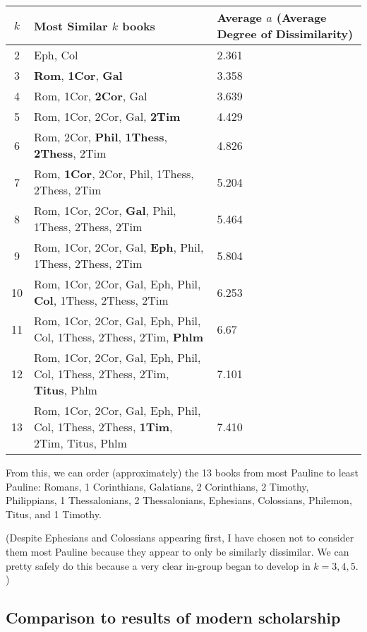 \documentclass[12pt,letterpaper]{article}
\begin{document}
\begin{center}
\begin{tabular}{|c|p{10cm}|p{5cm}|}
\hline
$k$ & Most Similar $k$ books & Average $a$ (Average Degree of Dissimilarity) \\\hline \hline
2 & Eph, Col & 2.361 \\ \hline
3 & \textbf{Rom},\textbf{ 1Cor}, \textbf{Gal} & 3.358 \\ \hline
4 & Rom, 1Cor, \textbf{2Cor}, Gal & 3.639 \\ \hline
5 & Rom, 1Cor, 2Cor, Gal, \textbf{2Tim} & 4.429 \\ \hline
6 & Rom, 2Cor, \textbf{Phil}, \textbf{1Thess}, \textbf{2Thess}, 2Tim & 4.826 \\ \hline
7 & Rom, \textbf{1Cor}, 2Cor, Phil, 1Thess, 2Thess, 2Tim & 5.204 \\ \hline
8 & Rom, 1Cor, 2Cor, \textbf{Gal}, Phil, 1Thess, 2Thess, 2Tim & 5.464 \\ \hline
9 & Rom, 1Cor, 2Cor, Gal, \textbf{Eph}, Phil, 1Thess, 2Thess, 2Tim & 5.804 \\ \hline
10 & Rom, 1Cor, 2Cor, Gal, Eph, Phil, \textbf{Col}, 1Thess, 2Thess, 2Tim & 6.253 \\ \hline
11 & Rom, 1Cor, 2Cor, Gal, Eph, Phil, Col, 1Thess, 2Thess, 2Tim, \textbf{Phlm} & 6.67 \\ \hline
12 & Rom, 1Cor, 2Cor, Gal, Eph, Phil, Col, 1Thess, 2Thess, 2Tim, \textbf{Titus}, Phlm & 7.101 \\ \hline
13 & Rom, 1Cor, 2Cor, Gal, Eph, Phil, Col, 1Thess, 2Thess, \textbf{1Tim}, 2Tim, Titus, Phlm & 7.410 \\ \hline
\end{tabular}
\end{center}

From this, we can order (approximately) the 13 books from most Pauline to least Pauline: Romans, 1 Corinthians, Galatians, 2 Corinthians, 2 Timothy, Philippians, 1 Thessalonians, 2 Thessalonians, Ephesians, Colossians, Philemon, Titus, and 1 Timothy.  

(Despite Ephesians and Colossians appearing first, I have chosen not to consider them most Pauline because they appear to only be similarly dissimilar.  We can pretty safely do this because a very clear in-group began to develop in $k = 3,4,5.$)

\subsection{Comparison to results of modern scholarship}
\end{document}
